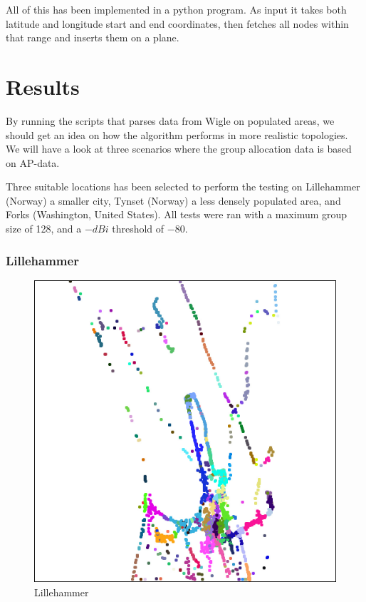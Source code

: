 \documentclass[a4paper,UKenglish]{report}
\begin{document}
All of this has been implemented in a python program. As input it takes both latitude and longitude start and end coordinates,
then fetches all nodes within that range and inserts them on a plane. 

\section{Results}
By running the scripts that parses data from Wigle on populated areas, we should get an idea 
on how the algorithm performs in more realistic topologies. We will have a look at three
scenarios where the group allocation data is based on AP-data. 

Three suitable locations has been selected to perform the testing on Lillehammer (Norway)
a smaller city, Tynset (Norway) a less densely populated area, 
and Forks (Washington, United States). All tests were 
ran with a maximum group size of 128, and a $-dBi$ threshold of $-80$. 

\subsubsection{Lillehammer}
\begin{figure}
	\center
	\includegraphics[scale=0.46]{Images/cities/lillehammer_groups.jpg}
	\caption{Lillehammer}
	\label{fig:lillehammer_topo}
\end{figure}
\end{document}
